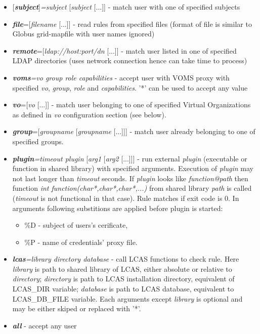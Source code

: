 \documentclass{article}
\begin{document}
\begin{itemize}
\item {[}\textbf{\textit{subject}}{]}\textit{=subject}
  {[}\textit{subject} {[}...{]}{]} - match user with one of specified
  subjects
\item \textbf{\textit{file}}={[}\textit{filename} {[}...{]}{]} - read
  rules from specified files (format of file is similar to Globus
  grid-mapfile with user names ignored)
\item \textbf{\textit{remote}}={[}\textit{ldap://host:port/dn}
  {[}...{]}{]} - match user listed in one of specified LDAP
  directories (uses network connection hence can take time to process)
\item \textbf{\textit{voms}}\textit{=vo group role capabilities} -
  accept user with VOMS proxy with specified \textit{vo},
  \textit{group}, \textit{role} and \textit{capabilities}. '{*}' can
  be used to accept any value
\item \textbf{\textit{vo}}={[}\textit{vo} {[}...{]}{]} - match user
  belonging to one of specified Virtual Organizations as defined in
  \emph{vo} configuration section (see below).
\item \textbf{\textit{group}}={[}\textit{groupname}
  {[}\textit{groupname} {[}...{]}{]}{]} - match user already belonging
  to one of specified groups.
\item \textbf{\textit{plugin}}\textit{=timeout plugin}
  {[}\textit{arg1} {[}\textit{arg2} {[}...{]}{]}{]} - run external
  \emph{plugin} (executable or function in shared library) with
  specified arguments. Execution of \emph{plugin} may not last longer
  than \emph{timeout} seconds.  If \emph{plugin} looks like
  \emph{function@path} then function \emph{int
    function(char{*},char{*},char{*},...)} from shared library
  \emph{path} is called (\emph{timeout} is not functional in that
  case). Rule matches if exit code is 0. In arguments following
  substitions are applied before plugin is started:

\begin{itemize}
\item \%D - subject of users's cerificate,
\item \%P - name of credentials' proxy file.
\end{itemize}

\item \textbf{\textit{lcas}}\textit{=library directory database} -
  call LCAS functions to check rule. Here \textit{library} is path to
  shared library of LCAS, either absolute or relative to
  \textit{directory}; \textit{directory} is path to LCAS installation
  directory, equivalent of LCAS\_DIR variable; \textit{database} is
  path to LCAS database, equivalent to LCAS\_DB\_FILE variable. Each
  arguments except \textit{library} is optional and may be either
  skiped or replaced with '{*}'.
\item \textbf{\textit{all}} - accept any user
\end{itemize}
\end{document}
